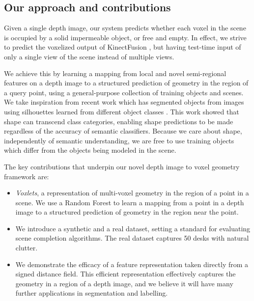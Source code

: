 \documentclass[10pt,twocolumn,letterpaper]{article}
\begin{document}
\subsection{Our approach and contributions}

Given a single depth image, our system predicts whether each voxel in the scene is occupied by a solid impermeable object, or free and empty.
In effect, we strive to predict the voxelized output of KinectFusion \cite{izadi-uist-2011}, but having test-time input of only a single view of the scene instead of multiple views.

We achieve this by learning a mapping from local and novel semi-regional features on a depth image to a structured prediction of geometry in the region of a query point, using a general-purpose collection of training objects and scenes.
We take inspiration from recent work which has segmented objects from images using silhouettes learned from different object classes \cite{kim-eccv-2012}.
This work showed that shape can transcend class categories, enabling shape predictions to be made regardless of the accuracy of semantic classifiers.
Because we care about shape, independently of semantic understanding, we are free to use training objects which differ from the objects being modeled in the scene.

The key contributions that underpin our novel depth image to voxel geometry framework are:
\begin{itemize}
\item \emph{Voxlets}, a representation of multi-voxel geometry in the region of a point in a scene.
We use a Random Forest to learn a mapping from a point in a depth image to a structured prediction of geometry in the region near the point.
\item We introduce a synthetic and a real dataset, setting a standard for evaluating scene completion algorithms.
The real dataset captures 50 desks with natural clutter.
\item We demonstrate the efficacy of a feature representation taken directly from a signed distance field.
This efficient representation effectively captures the geometry in a region of a depth image, and we believe it will have many further applications in segmentation and labelling.
\end{itemize}


\end{document}
